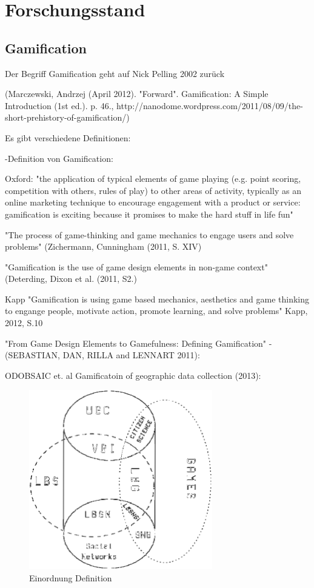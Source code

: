 \chapter{Forschungsstand}
\label{sec:S3_Forschungsstand}

\section{Gamification}
\label{subsec:S3_Gamification}

Der Begriff Gamification geht auf Nick Pelling 2002 zurück \cite{marczewski2013gamification}

 (Marczewski, Andrzej (April 2012). "Forward". Gamification: A Simple Introduction (1st ed.). p. 46., http://nanodome.wordpress.com/2011/08/09/the-short-prehistory-of-gamification/)

Es gibt verschiedene Definitionen:

-Definition von Gamification:

Oxford:
"the application of typical elements of game playing (e.g. point scoring, competition with others, rules of play) to other areas of activity, typically as an online marketing technique to encourage engagement with a product or service:
gamification is exciting because it promises to make the hard stuff in life fun"

"The process of game-thinking and game mechanics to engage users and solve problems"
(Zichermann, Cunningham (2011, S. XIV)

"Gamification is the use of game design elements in non-game context"
(Deterding, Dixon et al. (2011, S2.)

Kapp "Gamification is using game based mechanics, aesthetics and game thinking to engange people, motivate action, promote learning, and solve problems"
Kapp, 2012, S.10


"From Game Design Elements to Gamefulness: Defining Gamification" - (SEBASTIAN, DAN, RILLA and LENNART 2011):


ODOBSAIC et. al Gamificatoin of geographic data collection (2013):

\begin{figure}[H]
\begin{center}
\includegraphics[width=80mm]{images/ch3_img01_LBG_SN_etc.png}
\caption{Einordnung Definition}
\label{img:ch3_img01_LBG_SN_etc}
\end{center}
\end{figure}

